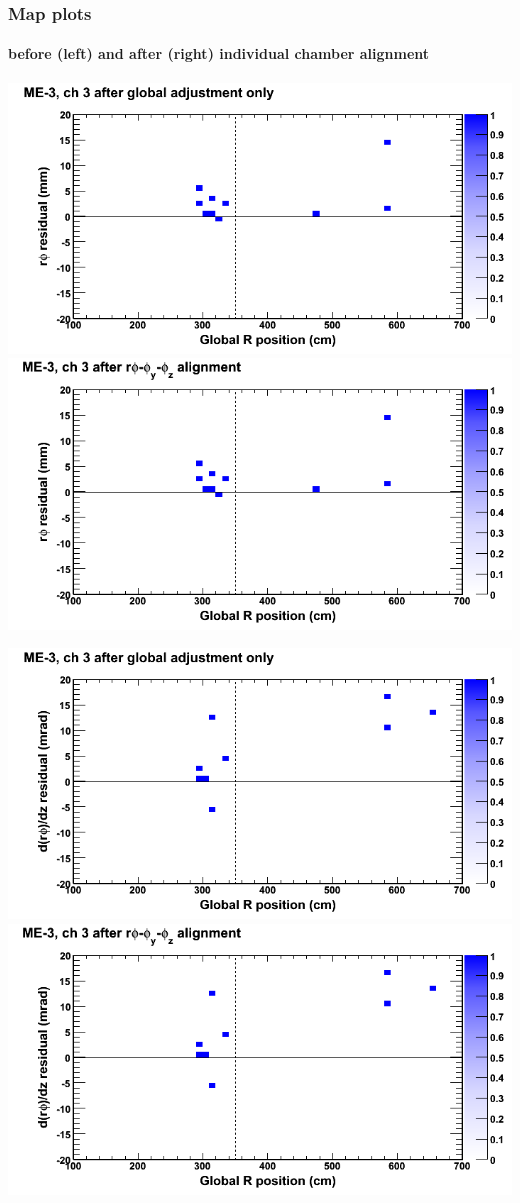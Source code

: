 \documentclass[compress]{beamer}
\begin{document}
\begin{frame}
\frametitle{Map plots}
\framesubtitle{before (left) and after (right) individual chamber alignment}
\includegraphics[width=0.5\linewidth]{ringmapplots_3dof/before_CSCvsr_mem3ch03_x.png} \includegraphics[width=0.5\linewidth]{ringmapplots_3dof/after_CSCvsr_mem3ch03_x.png}

\includegraphics[width=0.5\linewidth]{ringmapplots_3dof/before_CSCvsr_mem3ch03_dxdz.png} \includegraphics[width=0.5\linewidth]{ringmapplots_3dof/after_CSCvsr_mem3ch03_dxdz.png}
\end{frame}
\end{document}
